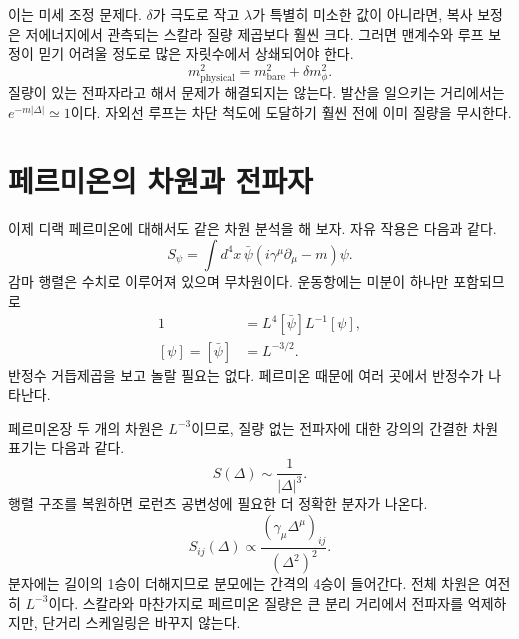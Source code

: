이는 미세 조정 문제다. \(\delta\)가 극도로 작고 \(\lambda\)가 특별히 미소한 값이 아니라면, 복사 보정은 저에너지에서 관측되는 스칼라 질량 제곱보다 훨씬 크다. 그러면 맨계수와 루프 보정이 믿기 어려울 정도로 많은 자릿수에서 상쇄되어야 한다.
\begin{equation}
m_{\mathrm{physical}}^2
=m_{\mathrm{bare}}^2+\delta m_\phi^2.
\end{equation}
질량이 있는 전파자라고 해서 문제가 해결되지는 않는다. 발산을 일으키는 거리에서는 \(e^{-m|\Delta|}\simeq1\)이다. 자외선 루프는 차단 척도에 도달하기 훨씬 전에 이미 질량을 무시한다.

\section{페르미온의 차원과 전파자}

이제 디랙 페르미온에 대해서도 같은 차원 분석을 해 보자. 자유 작용은 다음과 같다.
\begin{equation}
S_\psi=\int d^4x\,
\bar\psi\left(i\gamma^\mu\partial_\mu-m\right)\psi.
\end{equation}
감마 행렬은 수치로 이루어져 있으며 무차원이다. 운동항에는 미분이 하나만 포함되므로
\begin{align}
1
&=L^4[\bar\psi]L^{-1}[\psi],\\
[\psi]=[\bar\psi]&=L^{-3/2}.
\end{align}
반정수 거듭제곱을 보고 놀랄 필요는 없다. 페르미온 때문에 여러 곳에서 반정수가 나타난다.

\begin{classroomqa}
\end{classroomqa}

페르미온장 두 개의 차원은 \(L^{-3}\)이므로, 질량 없는 전파자에 대한 강의의 간결한 차원 표기는 다음과 같다.
\begin{equation}
S(\Delta)\sim\frac{1}{|\Delta|^3}.
\end{equation}
행렬 구조를 복원하면 로런츠 공변성에 필요한 더 정확한 분자가 나온다.
\begin{equation}
S_{ij}(\Delta)
\propto
\frac{\left(\gamma_\mu\Delta^\mu\right)_{ij}}
{\left(\Delta^2\right)^2}.
\end{equation}
분자에는 길이의 1승이 더해지므로 분모에는 간격의 4승이 들어간다. 전체 차원은 여전히 \(L^{-3}\)이다. 스칼라와 마찬가지로 페르미온 질량은 큰 분리 거리에서 전파자를 억제하지만, 단거리 스케일링은 바꾸지 않는다.

